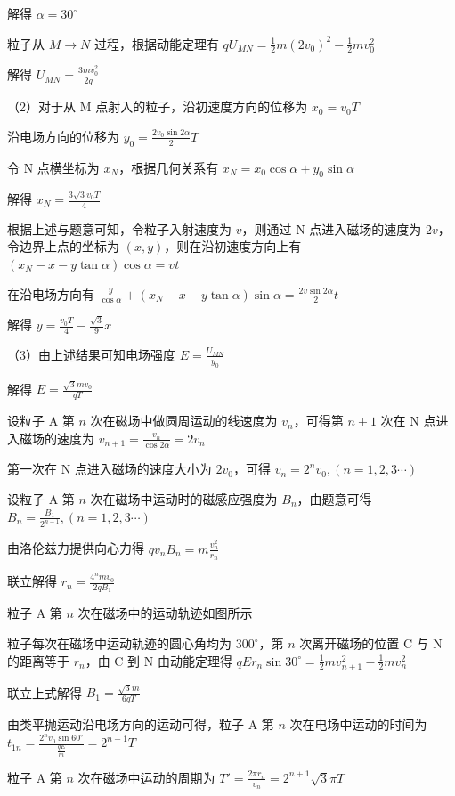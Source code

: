 \documentclass[\gkver]{gaokaozhenti}
\begin{document}
\begin{enumerate}
{解得 $\alpha=30^\circ$

粒子从 $M\to N$ 过程，根据动能定理有
$qU_{MN}=\frac{1}{2}m(2v_{0})^{2}-\frac{1}{2}mv_{0}^{2}$

解得 $U_{MN}=\frac{3mv_{0}^{2}}{2q}$

（2）对于从 M 点射入的粒子，沿初速度方向的位移为
$x_{0}=v_{0}T$

沿电场方向的位移为
$y_{0}=\frac{2v_{0}\sin2\alpha}{2}T$

令 N 点横坐标为 $x_{N}$，根据几何关系有
$x_{N}=x_{0}\cos\alpha+y_{0}\sin\alpha$

解得 $x_{N}=\frac{3\sqrt{3}v_{0}T}{4}$

根据上述与题意可知，令粒子入射速度为 $v$，则通过 N 点进入磁场的速度为 $2v$，令边界上点的坐标为 $(x,y)$，则在沿初速度方向上有
$(x_{N}-x-y\tan\alpha)\cos\alpha=vt$

在沿电场方向有
$\frac{y}{\cos\alpha}+(x_{N}-x-y\tan\alpha)\sin\alpha=\frac{2v\sin2\alpha}{2}t$

解得 $y=\frac{v_{0}T}{4}-\frac{\sqrt{3}}{9}x$

（3）由上述结果可知电场强度 $E=\frac{U_{MN}}{y_{0}}$

解得 $E=\frac{\sqrt{3}mv_{0}}{qT}$

设粒子 A 第 $n$ 次在磁场中做圆周运动的线速度为 $v_{n}$，可得第 $n+1$ 次在 N 点进入磁场的速度为
$v_{n+1}=\frac{v_{n}}{\cos2\alpha}=2v_{n}$

第一次在 N 点进入磁场的速度大小为 $2v_{0}$，可得
$v_{n}=2^{n}v_{0},(n=1,2,3\cdots)$

设粒子 A 第 $n$ 次在磁场中运动时的磁感应强度为 $B_{n}$，由题意可得
$B_{n}=\frac{B_{1}}{2^{n-1}},(n=1,2,3\cdots)$

由洛伦兹力提供向心力得
$qv_{n}B_{n}=m\frac{v_{n}^{2}}{r_{n}}$

联立解得
$r_{n}=\frac{4^{n}mv_{0}}{2qB_{1}}$

粒子 A 第 $n$ 次在磁场中的运动轨迹如图所示


粒子每次在磁场中运动轨迹的圆心角均为 $300^\circ$，第 $n$ 次离开磁场的位置 C 与 N 的距离等于 $r_{n}$，由 C 到 N 由动能定理得
$qEr_{n}\sin30^\circ=\frac{1}{2}mv_{n+1}^{2}-\frac{1}{2}mv_{n}^{2}$

联立上式解得 $B_{1}=\frac{\sqrt{3}m}{6qT}$

由类平抛运动沿电场方向的运动可得，粒子 A 第 $n$ 次在电场中运动的时间为
$t_{1n}=\frac{2^{n}v_{0}\sin60^\circ}{\frac{qE}{m}}=2^{n-1}T$

粒子 A 第 $n$ 次在磁场中运动的周期为
$T'=\frac{2\pi r_{n}}{v_{n}}=2^{n+1}\sqrt{3}\pi T$

}
\end{enumerate}
\end{document}
